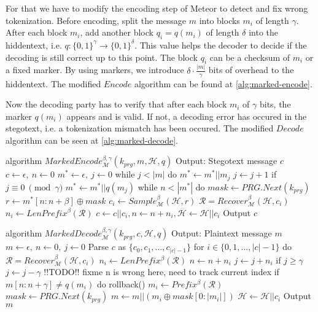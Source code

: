 For that we have to modify the encoding step of Meteor to detect and fix wrong tokenization.
Before encoding, split the message $m$ into blocks $m_i$ of length $\gamma$.
After each block $m_i$, add another block $q_i = q(m_i)$ of length $\delta$ into the hiddentext, i.e. $q \colon \{ 0,1 \}^\gamma \rightarrow \{ 0,1 \}^\delta$.
This value helps the decoder to decide if the decoding is still correct up to this point.
The block $q_i$ can be a checksum of $m_i$ or a fixed marker.
By using markers, we introduce $\delta \cdot \frac{|m|}{\gamma}$ bits of overhead to the hiddentext.
The modified $Encode$ algorithm can be found at \autoref{alg:marked-encode}.

Now the decoding party has to verify that after each block $m_i$ of $\gamma$ bits, the marker $q(m_i)$ appears and is valid.
If not, a decoding error has occured in the stegotext, i.e. a tokenization mismatch has been occured.
The modified $Decode$ algorithm can be seen at \autoref{alg:marked-decode}.

\begin{Pseudocode}[float, caption={Marked Encode Algorithm}, label={alg:marked-encode}]
algorithm $MarkedEncode_{\mathcal{M}}^{\beta, \gamma}(k_{prg}, m, \mathcal{H}, q)$
	Output: Stegotext message $c$
	$c \leftarrow \epsilon,~ n \leftarrow 0$
	$m^* \leftarrow \epsilon,~ j \leftarrow 0$
	while $j < |m|$ do
		$m^* \leftarrow m^* || m_j$
		$j \leftarrow j + 1$
		if $j \equiv 0~ \pmod \gamma$
			$m^* \leftarrow m^* || q(m_j)$
	while $n < |m^*|$ do
		$mask \leftarrow PRG.Next(k_{prg})$
		$r \leftarrow m^*[n:n+\beta] \oplus mask$
		$c_i \leftarrow Sample_{\mathcal{M}}^\beta(\mathcal{H}, r)$
		$\mathcal{R} = Recover_{\mathcal{M}}^\beta(\mathcal{H}, c_i)$
		$n_i \leftarrow LenPrefix^\beta(\mathcal{R})$
		$c \leftarrow c || c_i, n \leftarrow n+n_i, \mathcal{H} \leftarrow \mathcal{H}||c_i$
	Output $c$
\end{Pseudocode}



\begin{Pseudocode}[float, caption={Marked Decode Algorithm}, label={alg:marked-decode}]
algorithm $MarkedDecode_{\mathcal{M}}^{\beta,\gamma}(k_{prg}, c, \mathcal{H}, q)$
	Output: Plaintext message $m$
	$m \leftarrow \epsilon,~ n \leftarrow 0,~ j \leftarrow 0$
	Parse $c$ as $\{ c_0, c_1, \dots, c_{|c|-1} \}$
	for $i \in \{0, 1, \dots, |c|-1 \}$ do
		$\mathcal{R} = Recover_{\mathcal{M}}^\beta(\mathcal{H}, c_i)$
		$n_i \leftarrow LenPrefix^\beta(\mathcal{R})$
		$n \leftarrow n + n_i$
		$j \leftarrow j + n_i$
		if $j \geq \gamma$
			$j \leftarrow j - \gamma$
			!!TODO!! fixme n is wrong here, need to track current index
			if $m[n:n+\gamma] \neq q(m_i)$ do
				rollback()
		$m_i \leftarrow Prefix^\beta(\mathcal{R})$
		$mask \leftarrow PRG.Next(k_{prg})$
		$m \leftarrow m || (m_i \oplus mask[0: |m_i|])$
		$\mathcal{H} \leftarrow \mathcal{H}||c_i$
	Output $m$
\end{Pseudocode}


